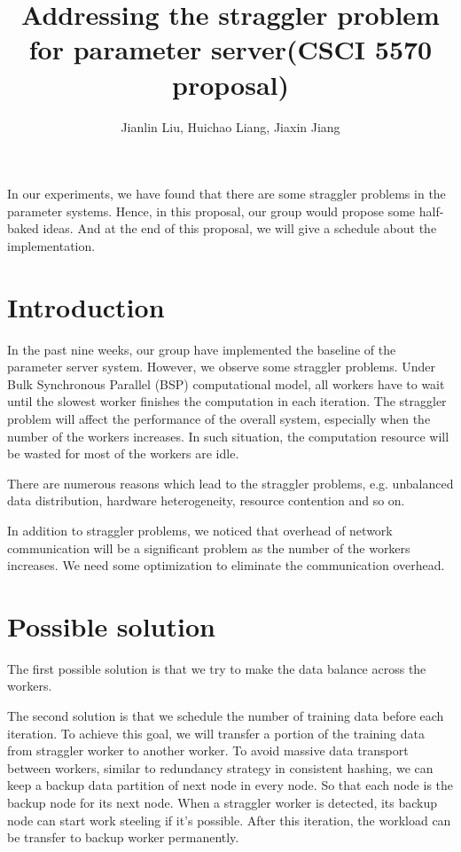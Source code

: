 \documentclass{article}
\begin{document}
\newcommand{\stitle}[1]{\vspace{0.4ex}\noindent{\bf #1}}

\title{Addressing the straggler problem for parameter server(CSCI 5570 proposal)}
\author{Jianlin Liu, Huichao Liang, Jiaxin Jiang}

\maketitle

\noindent In our experiments, we have found that there are some straggler problems in the parameter systems. Hence, in this proposal, our group would propose some half-baked ideas. And at the end of this proposal, we will give a schedule about the implementation.

\section{Introduction}

\noindent In the past nine weeks, our group have implemented the baseline of the parameter server system. However, we observe some straggler problems. Under Bulk Synchronous Parallel (BSP) computational model, all workers have to wait until the slowest worker finishes the computation in each iteration. The straggler problem will affect the performance of the overall system, especially when the number of the workers increases. In such situation, the computation resource will be wasted for most of the workers are idle.

\noindent There are numerous reasons which lead to the straggler problems, e.g. unbalanced data distribution, hardware heterogeneity, resource contention and so on.

\noindent In addition to straggler problems, we noticed that overhead of network communication will be a significant problem as the number of the workers increases. We need some optimization to eliminate the communication overhead.

\section{Possible solution}

\noindent The first possible solution is that we try to make the data balance across the workers.

\noindent The second solution is that we schedule the number of training data before each iteration. To achieve this goal, we will transfer a portion of the training data from straggler worker to another worker. To avoid massive data transport between workers, similar to redundancy strategy in consistent hashing, we can keep a backup data partition of next node in every node. So that each node is the backup node for its next node. When a straggler worker is detected, its backup node can start work steeling if it’s possible. After this iteration, the workload can be transfer to backup worker permanently.
\end{document}
